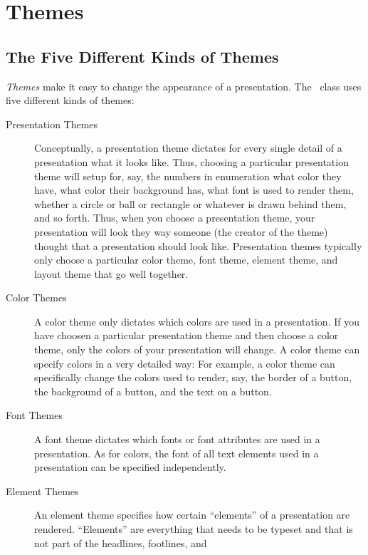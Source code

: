 
%


\section{Themes}

\subsection{The Five Different Kinds of Themes}

\emph{Themes} make it easy to change the appearance of a
presentation. The \beamer\ class uses five different kinds of themes:
\begin{description}
\item[Presentation Themes]
  Conceptually, a presentation theme dictates for every single detail
  of a presentation what it looks like. Thus, choosing a particular
  presentation theme will setup for, say, the numbers in enumeration
  what color they have, what color their background has, what font is
  used to render them, whether a circle or ball or rectangle or
  whatever is drawn behind them, and so forth. Thus, when you choose
  a presentation theme, your presentation will look they way someone
  (the creator of the theme) thought that a presentation should look
  like. Presentation themes typically only choose a particular color
  theme, font theme, element theme, and layout theme that go well
  together. 
\item[Color Themes]
  A color theme only dictates which colors are used in a
  presentation. If you have choosen a particular presentation theme
  and then choose a color theme, only the colors of your presentation
  will change. A color theme can specify colors in a very detailed
  way: For example, a color theme can specifically change the colors
  used to render, say, the border of a button, the background of a
  button, and the text on a button.
\item[Font Themes]
  A font theme dictates which fonts or font attributes are used in a
  presentation. As for colors, the font of all text elements used in a
  presentation can be specified independently.
\item[Element Themes]
  An element theme specifies how certain ``elements'' of a
  presentation are rendered. ``Elements'' are everything that needs to
  be typeset and that is not part of the headlines, footlines, and

\end{description}
